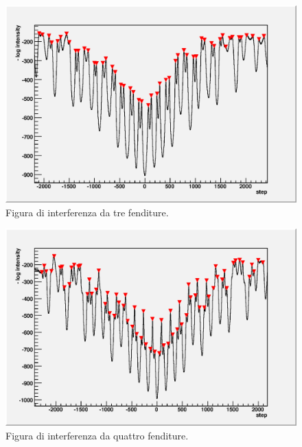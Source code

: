\documentclass[italian,a4paper]{article}
\begin{document}
\begin{figure}[!h]\centering
\includegraphics[scale=.6]{3slits.outint.eps}
\caption{Figura di interferenza da tre fenditure.}\label{3slitsint}
\end{figure}
\begin{figure}[!h]\centering
\includegraphics[scale=.6]{4slits.outint.eps}
\caption{Figura di interferenza da quattro fenditure.}\label{4slitsint}
\end{figure}
\end{document}
